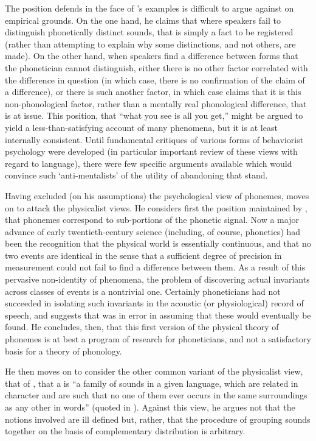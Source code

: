 The position {\Twaddell} defends in the face of {\Sapir}'s examples is
difficult to argue against on empirical grounds. On the one hand, he
claims that where speakers fail to distinguish phonetically distinct
sounds, that is simply a fact to be registered (rather than attempting
to explain why some distinctions, and not others, are made). On the
other hand, when speakers find a difference between forms that the
phonetician cannot distinguish, either there is no other factor
correlated with the difference in question (in which case, there is no
confirmation of the claim of a difference), or there is such another
factor, in which case {\Twaddell} claims that it is this non-phonological
factor, rather than a mentally real phonological difference, that is
at issue. This position, that ``what you see is all you get,'' might
be argued to yield a less-than-satisfying account of many phenomena,
but it is at least internally consistent. Until fundamental critiques
of various forms of behaviorist psychology were developed (in
particular  important review of
these views with regard to language), there were few specific
arguments available which would convince such `anti-mentalists' of the
utility of abandoning that stand.

Having excluded (on his assumptions) the psychological view of
phonemes, {\Twaddell} moves on to attack the physicalist views. He
considers first the position maintained by {\Bloomfield}, that phonemes
correspond to  sub-portions of the phonetic signal. Now a
major advance of early twentieth-century science (including, of
course, phonetics) had been the recognition that the physical world is
essentially continuous, and that no two events are identical in the
sense that a sufficient degree of precision in measurement could not
fail to find a difference between them. As a result of this pervasive
non-identity of phenomena, the problem of discovering actual
invariants across classes of events is a nontrivial one. Certainly
phoneticians had not succeeded in isolating such invariants in the
acoustic (or physiological) record of speech, and {\Twaddell} suggests
that {\Bloomfield} was in error in assuming that these would eventually
be found. He concludes, then, that this first version of the physical
theory of phonemes is at best a program of research for phoneticians,
and not a satisfactory basis for a theory of phonology.

He then moves on to consider the other common variant of the
physicalist view, that of , that a  is ``a family
of sounds in a given language, which are related in character and are
such that no one of them ever occurs in the same surroundings as any
other in words'' (quoted in
\citealt[25]{twaddell35:on.defining}). Against this view, he argues not
that the notions involved are ill defined but, rather, that the
procedure of grouping sounds together on the basis of complementary
distribution is arbitrary.


